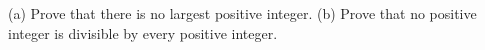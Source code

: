 (a) Prove that there is no largest positive integer. (b) Prove that no positive integer is divisible by every positive integer.
